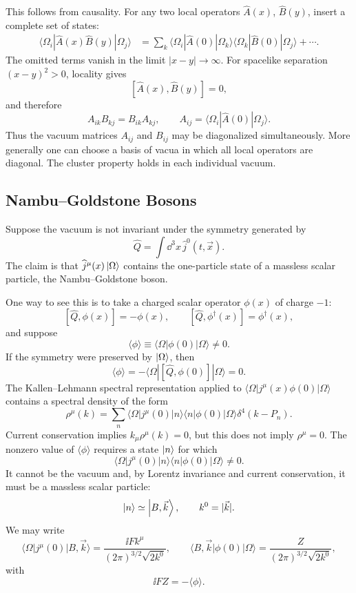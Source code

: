 This follows from causality.  For any two local operators
\(\widehat A(x)\), \(\widehat B(y)\), insert a complete set of states:
\[
\begin{aligned}
  \langle\Omega_i|\widehat A(x)\widehat B(y)|\Omega_j\rangle
  &=
  \sum_k
  \langle\Omega_i|\widehat A(0)|\Omega_k\rangle
  \langle\Omega_k|\widehat B(0)|\Omega_j\rangle
  +\cdots .
\end{aligned}
\]
The omitted terms vanish in the limit \(|x-y|\to\infty\).  For spacelike
separation \((x-y)^2>0\), locality gives
\[
  [\widehat A(x),\widehat B(y)]=0,
\]
and therefore
\[
  A_{ik}B_{kj}=B_{ik}A_{kj},
  \qquad
  A_{ij}=\langle\Omega_i|\widehat A(0)|\Omega_j\rangle .
\]
Thus the vacuum matrices \(A_{ij}\) and \(B_{ij}\) may be diagonalized
simultaneously.  More generally one can choose a basis of vacua in which
all local operators are diagonal.  The cluster property holds in each
individual vacuum.

\subsection{Nambu--Goldstone Bosons}

Suppose the vacuum is not invariant under the symmetry generated by
\[
  \widehat Q=\int\dd^3x\,\widehat j^0(t,\vec x).
\]
The claim is that \(\widehat j^\mu(x)\ket\Omega\) contains the
one-particle state of a massless scalar particle, the
Nambu--Goldstone boson.

One way to see this is to take a charged scalar operator \(\phi(x)\) of
charge \(-1\):
\[
  [\widehat Q,\phi(x)]=-\phi(x),
  \qquad
  [\widehat Q,\phi^\dagger(x)]=\phi^\dagger(x),
\]
and suppose
\[
  \langle\phi\rangle
  \equiv
  \langle\Omega|\phi(0)|\Omega\rangle
  \ne0.
\]
If the symmetry were preserved by \(\ket\Omega\), then
\[
  \langle\phi\rangle
  =
  -\langle\Omega|[\widehat Q,\phi(0)]|\Omega\rangle
  =
  0.
\]
The Kallen--Lehmann spectral representation applied to
\(\langle\Omega|j^\mu(x)\phi(0)|\Omega\rangle\) contains a spectral
density of the form
\[
  \rho^\mu(k)
  =
  \sum_n
  \langle\Omega|j^\mu(0)|n\rangle
  \langle n|\phi(0)|\Omega\rangle
  \delta^4(k-P_n).
\]
Current conservation implies \(k_\mu\rho^\mu(k)=0\), but this does not
imply \(\rho^\mu=0\).  The nonzero value of
\(\langle\phi\rangle\) requires a state \(\ket n\) for which
\[
  \langle\Omega|j^\mu(0)|n\rangle
  \langle n|\phi(0)|\Omega\rangle\ne0.
\]
It cannot be the vacuum and, by Lorentz invariance and current
conservation, it must be a massless scalar particle:
\[
  \ket n\simeq\ket{B,\vec k},
  \qquad
  k^0=|\vec k|.
\]
We may write
\[
  \langle\Omega|j^\mu(0)|B,\vec k\rangle
  =
  \frac{\ii F k^\mu}{(2\pi)^{3/2}\sqrt{2k^0}},
  \qquad
  \langle B,\vec k|\phi(0)|\Omega\rangle
  =
  \frac{Z}{(2\pi)^{3/2}\sqrt{2k^0}},
\]
with
\[
  \ii FZ=-\langle\phi\rangle .
\]

